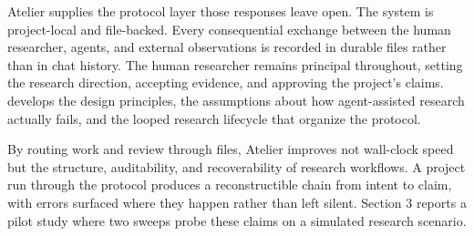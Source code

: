 Atelier supplies the protocol layer those responses leave open. The system is project-local and file-backed. Every consequential exchange between the human researcher, agents, and external observations is recorded in durable files rather than in chat history. The human researcher remains principal throughout, setting the research direction, accepting evidence, and approving the project's claims.  develops the design principles, the assumptions about how agent-assisted research actually fails, and the looped research lifecycle that organize the protocol.

By routing work and review through files, Atelier improves not wall-clock speed but the structure, auditability, and recoverability of research workflows. A project run through the protocol produces a reconstructible chain from intent to claim, with errors surfaced where they happen rather than left silent. Section 3 reports a pilot study where two sweeps probe these claims on a simulated research scenario.
